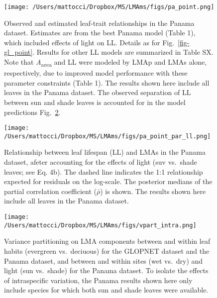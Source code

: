 \documentclass[
  12pt,
  letterpaper,
  DIV=11,
  numbers=noendperiod]{scrartcl}
\begin{document}
\newpage

\begin{figure}

{\centering \texttt{[image: /Users/mattocci/Dropbox/MS/LMAms/figs/pa\_point.png]}

}

\caption{\label{fig-pa_point}Observed and estimated leaf-trait
relationships in the Panama dataset. Estimates are from the best Panama
model (Table 1), which included effects of light on LL. Details as for
Fig.~\ref{fig-gl_point}. Results for other LL models are summarized in
Table SX. Note that \emph{A}\textsubscript{area} and LL were modeled by
LMAp and LMAs alone, respectively, due to improved model performance
with these parameter constraints (Table 1). The results shown here
include all leaves in the Panama dataset. The observed separation of LL
between sun and shade leaves is accounted for in the model predictions
Fig.~\ref{fig-ll_point}.}

\end{figure}

\newpage

\begin{figure}

{\centering \texttt{[image: /Users/mattocci/Dropbox/MS/LMAms/figs/pa\_point\_par\_ll.png]}

}

\caption{\label{fig-ll_point}Relationship between leaf lifespan (LL) and
LMAs in the Panama dataset, afeter accounting for the effects of light
(suv vs.~shade leaves; see Eq. 4b). The dashed line indicates the 1:1
relationship expected for residuals on the log-scale. The posterior
medians of the partial correlation coefficient (\(\bar{\rho}\)) is
shown. The results shown here include all leaves in the Panama dataset.}

\end{figure}

\newpage

\begin{figure}

{\centering \texttt{[image: /Users/mattocci/Dropbox/MS/LMAms/figs/vpart\_intra.png]}

}

\caption{\label{fig-vpart}Variance partitioning on LMA components
between and within leaf habits (evergreen vs.~deciuous) for the GLOPNET
dataset and the Panama dataset, and between and within sites (wet
vs.~dry) and light (sun vs.~shade) for the Panama dataset. To isolate
the effects of intraspecific variation, the Panama results shown here
only include species for which both sun and shade leaves were
available.}

\end{figure}
\end{document}
